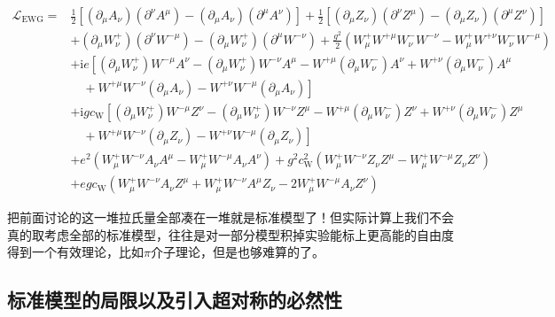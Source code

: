 \begin{equation}
	\begin{aligned}
		\mathcal{L}_{\mathrm{EWG}}= & \frac{1}{2}\left[\left(\partial_{\mu} A_{\nu}\right)\left(\partial^{\nu} A^{\mu}\right)-\left(\partial_{\mu} A_{\nu}\right)\left(\partial^{\mu} A^{\nu}\right)\right]+\frac{1}{2}\left[\left(\partial_{\mu} Z_{\nu}\right)\left(\partial^{\nu} Z^{\mu}\right)-\left(\partial_{\mu} Z_{\nu}\right)\left(\partial^{\mu} Z^{\nu}\right)\right] \\
		& +\left(\partial_{\mu} W_{\nu}^{+}\right)\left(\partial^{\nu} W^{-\mu}\right)-\left(\partial_{\mu} W_{\nu}^{+}\right)\left(\partial^{\mu} W^{-\nu}\right)+\frac{g^{2}}{2}\left(W_{\mu}^{+} W^{+\mu} W_{\nu}^{-} W^{-\nu}-W_{\mu}^{+} W^{+\nu} W_{\nu}^{-} W^{-\mu}\right) \\
		& +\mathrm{i} e\left[\left(\partial_{\mu} W_{\nu}^{+}\right) W^{-\mu} A^{\nu}-\left(\partial_{\mu} W_{\nu}^{+}\right) W^{-\nu} A^{\mu}-W^{+\mu}\left(\partial_{\mu} W_{\nu}^{-}\right) A^{\nu}+W^{+\nu}\left(\partial_{\mu} W_{\nu}^{-}\right) A^{\mu}\right. \\
		& \left.\quad+W^{+\mu} W^{-\nu}\left(\partial_{\mu} A_{\nu}\right)-W^{+\nu} W^{-\mu}\left(\partial_{\mu} A_{\nu}\right)\right] \\
		& +\mathrm{i} g c_{\mathrm{W}}\left[\left(\partial_{\mu} W_{\nu}^{+}\right) W^{-\mu} Z^{\nu}-\left(\partial_{\mu} W_{\nu}^{+}\right) W^{-\nu} Z^{\mu}-W^{+\mu}\left(\partial_{\mu} W_{\nu}^{-}\right) Z^{\nu}+W^{+\nu}\left(\partial_{\mu} W_{\nu}^{-}\right) Z^{\mu}\right. \\
		& \left.\quad+W^{+\mu} W^{-\nu}\left(\partial_{\mu} Z_{\nu}\right)-W^{+\nu} W^{-\mu}\left(\partial_{\mu} Z_{\nu}\right)\right] \\
		& +e^{2}\left(W_{\mu}^{+} W^{-\nu} A_{\nu} A^{\mu}-W_{\mu}^{+} W^{-\mu} A_{\nu} A^{\nu}\right)+g^{2} c_{\mathrm{W}}^{2}\left(W_{\mu}^{+} W^{-\nu} Z_{\nu} Z^{\mu}-W_{\mu}^{+} W^{-\mu} Z_{\nu} Z^{\nu}\right)\\
		&+egc_{\mathrm{W}}(W_{\mu}^{+}W^{-\nu}A_{\nu}Z^{\mu}+W_{\mu}^{+}W^{-\nu}A^{\mu}Z_{\nu}-2W_{\mu}^{+}W^{-\mu}A_{\nu}Z^{\nu})
	\end{aligned}
\end{equation}

把前面讨论的这一堆拉氏量全部凑在一堆就是标准模型了！但实际计算上我们不会真的取考虑全部的标准模型，往往是对一部分模型积掉实验能标上更高能的自由度得到一个有效理论，比如$\pi$介子理论，但是也够难算的了。
\subsection[为什么需要超对称？]{标准模型的局限以及引入超对称的必然性}

